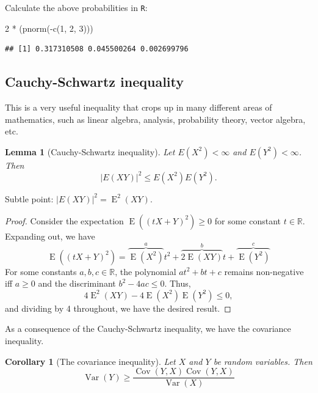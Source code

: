 \documentclass[
]{book}
\newenvironment{Shaded}{\begin{snugshade}}{\end{snugshade}}
\newcommand{\DecValTok}[1]{\textcolor[rgb]{0.00,0.00,0.81}{#1}}
\newcommand{\FunctionTok}[1]{\textcolor[rgb]{0.00,0.00,0.00}{#1}}
\newcommand{\NormalTok}[1]{#1}
\newcommand{\SpecialCharTok}[1]{\textcolor[rgb]{0.00,0.00,0.00}{#1}}
\DeclareMathOperator{\E}{E}
\DeclareMathOperator{\Var}{Var}
\DeclareMathOperator{\Cov}{Cov}
\newcommand{\bbR}{\mathbb{R}}
\newtheorem{lemma}{Lemma}[chapter]
\newtheorem{corollary}{Corollary}[chapter]
\theoremstyle{definition}
\theoremstyle{definition}
\theoremstyle{definition}
\theoremstyle{definition}
\theoremstyle{remark}
\begin{document}
Calculate the above probabilities in \texttt{R}:

\begin{Shaded}
\begin{Highlighting}[]
\DecValTok{2} \SpecialCharTok{*}\NormalTok{ (}\FunctionTok{pnorm}\NormalTok{(}\SpecialCharTok{{-}}\FunctionTok{c}\NormalTok{(}\DecValTok{1}\NormalTok{, }\DecValTok{2}\NormalTok{, }\DecValTok{3}\NormalTok{)))}
\end{Highlighting}
\end{Shaded}

\begin{verbatim}
## [1] 0.317310508 0.045500264 0.002699796
\end{verbatim}

\hypertarget{cauchy-schwartz-inequality}{%
\subsection{Cauchy-Schwartz inequality}\label{cauchy-schwartz-inequality}}

This is a very useful inequality that crops up in many different areas of mathematics, such as linear algebra, analysis, probability theory, vector algebra, etc.

\begin{lemma}[Cauchy-Schwartz inequality]
Let \(E(X^2)<\infty\) and \(E(Y^2)<\infty\). Then
\[|E(XY)|^2 \leq E(X^2)E(Y^2).\]
\end{lemma}

Subtle point: \(|E(XY)|^2 = \E^2(XY)\).

\begin{proof}
Consider the expectation \(\E((tX+Y)^2)\geq 0\) for some constant \(t\in\bbR\).
Expanding out, we have
\[
\E((tX+Y)^2) = \overbrace{\E(X^2)}^{a}t^2 + \overbrace{2\E(XY)}^{b}t+ \overbrace{\E(Y^2)}^{c}
\]
For some constants \(a,b,c\in\bbR\), the polynomial \(at^2 +bt + c\) remains non-negative iff \(a\geq 0\) and the discriminant \(b^2-4ac \leq 0\). Thus,
\[
4\E^2(XY) - 4\E(X^2)\E(Y^2) \leq 0,
\]
and dividing by 4 throughout, we have the desired result.
\end{proof}

As a consequence of the Cauchy-Schwartz inequality, we have the covariance inequality.

\begin{corollary}[The covariance inequality]
Let \(X\) and \(Y\) be random variables. Then
\[\Var(Y) \geq \frac{\Cov(Y,X)\Cov(Y,X)}{\Var(X)}\]
\end{corollary}
\end{document}
